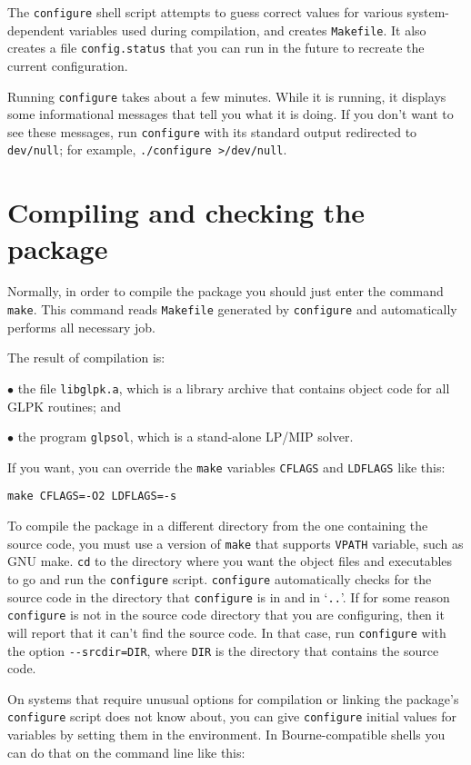 The \verb|configure| shell script attempts to guess correct values for
various system-dependent variables used during compilation, and creates
\verb|Makefile|. It also creates a file \verb|config.status| that you
can run in the future to recreate the current configuration.

Running \verb|configure| takes about a few minutes. While it is running,
it displays some informational messages that tell you what it is doing.
If you don't want to see these messages, run \verb|configure| with its
standard output redirected to \verb|dev/null|; for example,
\verb|./configure >/dev/null|.

\section{Compiling and checking the package}

Normally, in order to compile the package you should just enter the
command \verb|make|. This command reads \verb|Makefile| generated by
\verb|configure| and automatically performs all necessary job.

The result of compilation is:

$\bullet$ the file \verb|libglpk.a|, which is a library archive that
contains object code for all GLPK routines; and

$\bullet$ the program \verb|glpsol|, which is a stand-alone LP/MIP
solver.

If you want, you can override the \verb|make| variables \verb|CFLAGS|
and \verb|LDFLAGS| like this:

\verb|make CFLAGS=-O2 LDFLAGS=-s|

To compile the package in a different directory from the one containing
the source code, you must use a version of \verb|make| that supports
\verb|VPATH| variable, such as GNU make. \verb|cd| to the directory
where you want the object files and executables to go and run the
\verb|configure| script. \verb|configure| automatically checks for the
source code in the directory that \verb|configure| is in and in
`\verb|..|'. If for some reason \verb|configure| is not in the source
code directory that you are configuring, then it will report that it
can't find the source code. In that case, run \verb|configure| with the
option \verb|--srcdir=DIR|, where \verb|DIR| is the directory that
contains the source code.

On systems that require unusual options for compilation or linking the
package's \verb|configure| script does not know about, you can give
\verb|configure| initial values for variables by setting them in the
environment. In Bourne-compatible shells you can do that on the command
line like this:

